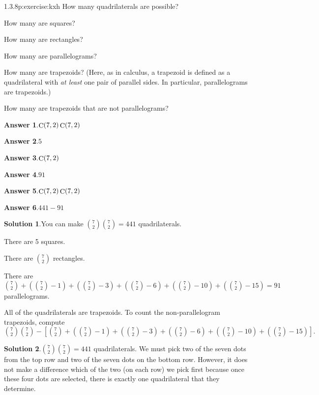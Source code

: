 \documentclass[twoside,11pt,]{book}
\newcommand{\blocktitlefont}{\relax}
\numberwithin{equation}{chapter}
\begin{document}
\begin{divisionsolution}{1.3.8}{}{p:exercise:kxh}%
How many quadrilaterals are possible?%
\par
How many are squares?%
\par
How many are rectangles?%
\par
How many are parallelograms?%
\par
How many are trapezoids? (Here, as in calculus, a trapezoid is defined as a quadrilateral with \emph{at least} one pair of parallel sides. In particular, parallelograms are trapezoids.)%
\par
How many are trapezoids that are not parallelograms?%
\par\smallskip%
\noindent\textbf{\blocktitlefont Answer 1}.\quad{}\(\mathop{\rm C}\nolimits\!\left(7,2\right)\mathop{\rm C}\nolimits\!\left(7,2\right)\)%
\par\smallskip%
\noindent\textbf{\blocktitlefont Answer 2}.\quad{}\(5\)%
\par\smallskip%
\noindent\textbf{\blocktitlefont Answer 3}.\quad{}\(\mathop{\rm C}\nolimits\!\left(7,2\right)\)%
\par\smallskip%
\noindent\textbf{\blocktitlefont Answer 4}.\quad{}\(91\)%
\par\smallskip%
\noindent\textbf{\blocktitlefont Answer 5}.\quad{}\(\mathop{\rm C}\nolimits\!\left(7,2\right)\mathop{\rm C}\nolimits\!\left(7,2\right)\)%
\par\smallskip%
\noindent\textbf{\blocktitlefont Answer 6}.\quad{}\(441-91\)%
\par\smallskip%
\noindent\textbf{\blocktitlefont Solution 1}.\quad{}You can make \({7\choose 2}{7\choose 2} = 441\) quadrilaterals.%
\par
There are 5 squares.%
\par
There are \({7 \choose 2}\) rectangles.%
\par
There are \({7 \choose 2} + ({7 \choose 2}-1) + ({7 \choose 2} - 3) + ({7 \choose 2} - 6) + ({7 \choose 2} - 10) + ({7 \choose 2} - 15) = 91\) parallelograms.%
\par
All of the quadrilaterals are trapezoids. To count the non-parallelogram trapezoids, compute \({7\choose 2}{7\choose 2} - \left[ {7 \choose 2} + ({7 \choose 2}-1) + ({7 \choose 2} - 3) + ({7 \choose 2} - 6) + ({7 \choose 2} - 10) + ({7 \choose 2} - 15) \right]\text{.}\)%
\par\smallskip%
\noindent\textbf{\blocktitlefont Solution 2}.\quad{}\({7\choose 2}{7\choose 2} = 441\) quadrilaterals. We must pick two of the seven dots from the top row and two of the seven dots on the bottom row. However, it does not make a difference which of the two (on each row) we pick first because once these four dots are selected, there is exactly one quadrilateral that they determine.%

\end{divisionsolution}
\end{document}
